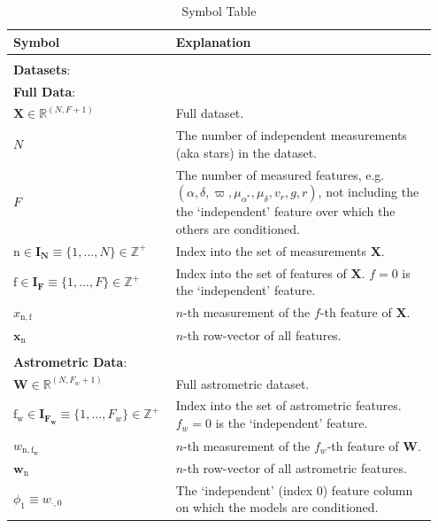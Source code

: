 \documentclass[twocolumn]{aastex631}
\newcommand{\mrm}[1]{\mathrm{#1}}
\newcommand{\mbs}[1]{\boldsymbol{#1}}
\newcommand{\mbf}[1]{\mathbf{#1}}
\newcommand{\mbb}[1]{\mathbb{#1}}
\newcommand{\nth}[1]{{#1}_{\mrm{n}}}  %
\begin{document}
    \begin{table}
    \centering
    \caption{Symbol Table}
    \label{table:symbol_table}
    \begin{tabular}{p{0.35\linewidth} p{0.6\linewidth}}
    Symbol                         & Explanation \\
    \toprule
    \\
    \multicolumn{2}{l}{\textbf{Datasets}:} \\
    \midrule
    \multicolumn{2}{l}{\textbf{Full Data}:}  \vspace{5pt} \\
    $\mbf{X} \in \mbb{R}^{(N, F+1)}$ & Full dataset.  \\
    $N$ & The number of independent measurements (aka stars) in the dataset.  \\
    $F$ & The number of measured features, e.g. $(\alpha, \delta, \varpi, \mu_{\alpha^*}, \mu_\delta, v_r, g, r)$,  not including the the `independent' feature over which the others are conditioned. \\
    $\mrm{n} \in \mbs{I_N} \equiv \{1, ..., N\} \in \mbb{Z^+}$ & Index into the set of measurements $\mbf{X}$. \\
    $\mrm{f} \in \mbs{I_F}  \equiv \{1, ..., F\} \in \mbb{Z^+}$ & Index into the set of features of $\mbf{X}$. $ f=0$ is the `independent' feature.\\
    $x_{\mrm{n,f}}$ & $n$-th measurement of the $f$-th feature of $\mbf{X}$. \\
    $\nth{\mbs{x}}$ & $n$-th row-vector of all features. \\
    \\
    \multicolumn{2}{l}{\textbf{Astrometric Data}:}  \vspace{5pt} \\
    $\mbf{W} \in \mathbb{R}^{(N, F_w + 1)}$ & Full astrometric dataset. \\
    $\mrm{f_w} \in \mbs{I_{F_w}} \equiv \{1, ..., F_w\} \in \mathbb{Z^+}$ & Index into the set of astrometric features. $f_w = 0$ is the `independent' feature.\\
    $w_{\mrm{n,f_w}}$ & $n$-th measurement of the $f_w$-th feature of $\mbf{W}.$\\
    $\nth{\mbs{w}}$ & $n$-th row-vector of all astrometric features. \\
    $\phi_1 \equiv w_{\cdot,0}$ & The `independent' (index 0) feature column on which the models are conditioned.\\

\end{tabular}
\end{table}
\end{document}
